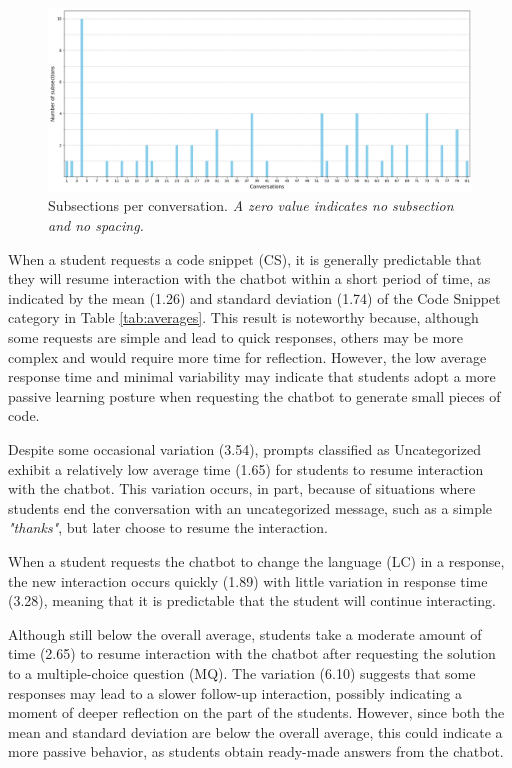 \documentclass[runningheads]{llncs}
\begin{document}
\begin{figure}[htbp]
  \centering
  \includegraphics[scale=0.3]{img/figure3.png}
  \caption{Subsections per conversation. \textit{A zero value indicates no
  subsection and no spacing.}}
  \label{fig:graph3}
\end{figure}

When a student requests a code snippet (CS), it is generally predictable that
they will resume interaction with the chatbot within a short period of time, as
indicated by the mean (1.26) and standard deviation (1.74) of the Code Snippet
category in Table \ref{tab:averages}. This result is noteworthy because,
although some requests are simple and lead to quick responses, others may be
more complex and would require more time for reflection. However, the low
average response time and minimal variability may indicate that students adopt a
more passive learning posture when requesting the chatbot to generate small pieces
of code.

Despite some occasional variation (3.54), prompts classified as Uncategorized
exhibit a relatively low average time (1.65) for students to resume interaction
with the chatbot. This variation occurs, in part, because of situations where students
end the conversation with an uncategorized message, such as a simple
\textit{"thanks"}, but later choose to resume the interaction.

When a student requests the chatbot to change the language (LC) in a response, the
new interaction occurs quickly (1.89) with little variation in response time
(3.28), meaning that it is predictable that the student will continue interacting.

Although still below the overall average, students take a moderate amount of
time (2.65) to resume interaction with the chatbot after requesting the solution to
a multiple-choice question (MQ). The variation (6.10) suggests that some
responses may lead to a slower follow-up interaction, possibly indicating a
moment of deeper reflection on the part of the students. However, since both the
mean and standard deviation are below the overall average, this could indicate
a more passive behavior, as students obtain ready-made answers from the chatbot.
\end{document}

